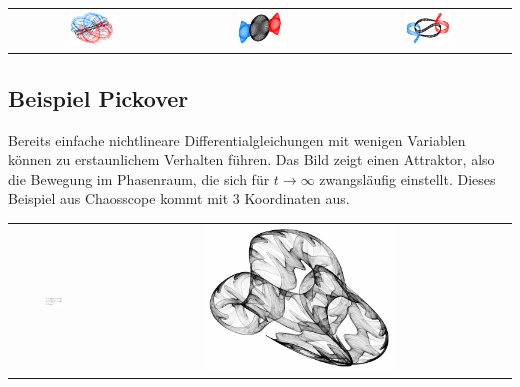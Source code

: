 \documentclass[12pt]{book}
\begin{document}
\begin{center}
\begin{tabular}{c c c}
\includegraphics[width=0.3\textwidth]{Bilder/3Koerper_Bumblebee.png}
&
\includegraphics[width=0.3\textwidth]{Bilder/3Koerper_Butterfly_IV.png}
&
\includegraphics[width=0.3\textwidth]{Bilder/3Koerper_Yin-Yang_2b.png}
\end{tabular}
\end{center}

\subsection{Beispiel Pickover}
Bereits einfache nichtlineare Differentialgleichungen mit wenigen Variablen können zu erstaunlichem Verhalten führen. Das Bild zeigt einen Attraktor, also die Bewegung im Phasenraum, die sich für $t\rightarrow\infty$ zwangsläufig einstellt. Dieses Beispiel aus Chaosscope kommt mit 3 Koordinaten aus.

\begin{center}
\begin{tabular}{c c c}
\includegraphics[width=0.2\textwidth]{Bilder/pickover_equation.png}
&
\includegraphics[width=0.5\textwidth]{Bilder/attractor_pickover.jpg}
\end{tabular}
\end{center}
\end{document}
